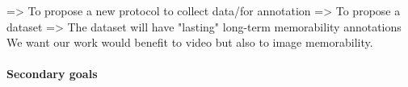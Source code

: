\documentclass[sigconf]{acmart}
\begin{document}
=> To propose a new protocol to collect data/for annotation
=> To propose a dataset
=> The dataset will have "lasting" long-term memorability annotations
We want our work would benefit to video but also to image memorability. 



\paragraph{Secondary goals}

\end{document}
